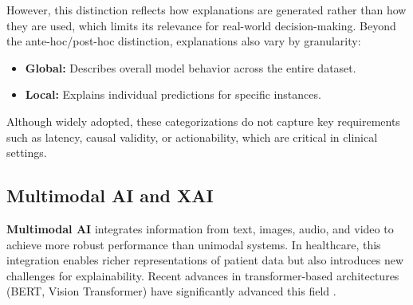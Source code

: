 \documentclass[pdflatex,sn-mathphys-num]{sn-jnl}%
\theoremstyle{thmstyleone}%
\theoremstyle{thmstyletwo}%
\theoremstyle{thmstylethree}%
\begin{document}
However, this distinction reflects how explanations are generated rather than how they are used, which limits its relevance for real-world decision-making.
Beyond the ante-hoc/post-hoc distinction, explanations also vary by granularity:
\begin{itemize}
    \item \textbf{Global:} Describes overall model behavior across the entire dataset.
    \item \textbf{Local:} Explains individual predictions for specific instances.
\end{itemize}
Although widely adopted, these categorizations do not capture key requirements such as latency, causal validity, or actionability, which are critical in clinical settings.
\subsection{Multimodal AI and XAI}
\label{subsection:multimodalaiandxai}
\textbf{Multimodal AI} integrates information from text, images, audio, and video to achieve more robust performance than unimodal systems.
In healthcare, this integration enables richer representations of patient data but also introduces new challenges for explainability.
Recent advances in transformer-based architectures (BERT, Vision Transformer) have significantly advanced this field \cite{rodis2024multimodalexplainableartificialintelligence,wani2024deepxplainer}.
\end{document}
